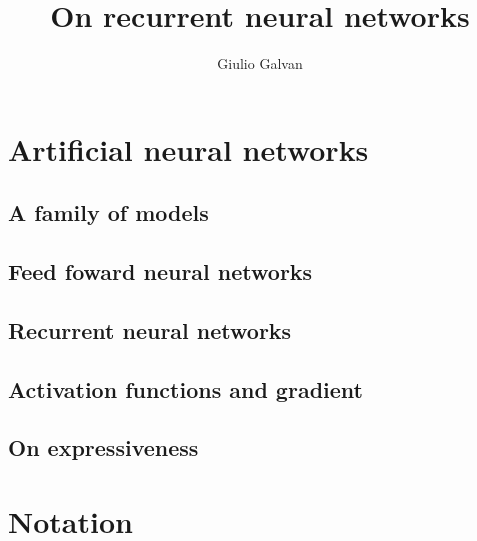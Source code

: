 \documentclass{book}
\title{On recurrent neural networks}
\author{Giulio Galvan}
\theoremstyle{definition}
\theoremstyle{definition}
\begin{document}
\maketitle
\tableofcontents
\chapter{Artificial neural networks}
\section{A family of models}

\section{Feed foward neural networks}

\section{Recurrent neural networks}

\section{Activation functions and gradient}

\section{On expressiveness}

\appendix
\chapter{Notation}



\newpage
 \nocite{*}		 %
{}

\end{document}

